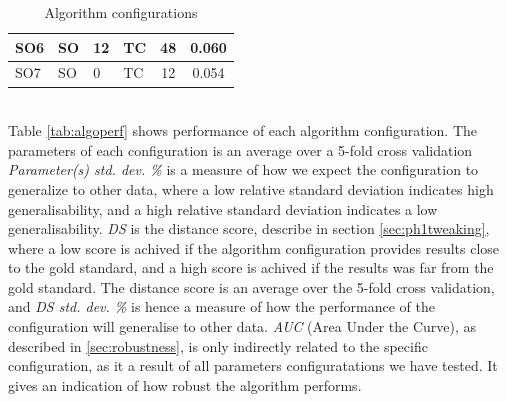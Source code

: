 \begin{table}[!ht]
\begin{tabular}{| l | l | p{2cm} | p{2cm} | c | c | }
    SO6 & SO & 12 & TC & 48 & 0.060 \\\hline
    SO7 & SO & 0 & TC & 12 & 0.054 \\\hline%
%
%
  \end{tabular}
\caption{Algorithm configurations}
\label{tab:algoconfigs}
\end{table}\\
%
Table \ref{tab:algoperf} shows performance of each algorithm configuration. The parameters of each configuration is an average over a 5-fold cross validation \textit{Parameter(s) std. dev. \%} is a measure of how we expect the configuration to generalize to other data, where a low relative standard deviation indicates high generalisability, and a high relative standard deviation indicates a low generalisability. \textit{DS} is the distance score, describe in section \ref{sec:ph1tweaking}, where a low score is achived if the algorithm configuration provides results close to the gold standard, and a high score is achived if the results was far from the gold standard. The distance score is an average over the 5-fold cross validation, and \textit{DS std. dev. \%} is hence a measure of how the performance of the configuration will generalise to other data. \textit{AUC} (Area Under the Curve), as described in \ref{sec:robustness}, is only indirectly related to the specific configuration, as it a result of all parameters configuratations we have tested. It gives an indication of how robust the algorithm performs.
